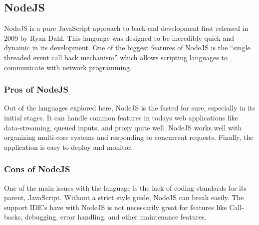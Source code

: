 \documentclass[onecolumn, draftclsnofoot,10pt, compsoc]{IEEEtran}
\begin{document}
\subsection{NodeJS}
NodeJS is a pure JavaScript approach to back-end development first released in 2009 by Ryan Dahl. This language was designed to be incredibly quick and dynamic in its development. One of the biggest features of NodeJS is the “single threaded event call back mechanism” which allows scripting languages to communicate with network programming. 

\subsubsection{Pros of NodeJS}
Out of the languages explored here, NodeJS is the fasted for sure, especially in its initial stages. It can handle common features in today\textquotesingle s web applications like data-streaming, queued inputs, and proxy quite well. NodeJS works well with organizing multi-core systems and responding to concurrent requests. Finally, the application is easy to deploy and monitor. 

\subsubsection{Cons of NodeJS}
One of the main issues with the language is the lack of coding standards for its parent, JavaScript. Without a strict style guide, NodeJS can break easily. The support IDE’s have with NodeJS is not necessarily great for features like Call-backs, debugging, error handling, and other maintenance features. \cite{intersog_2017}
\end{document}

